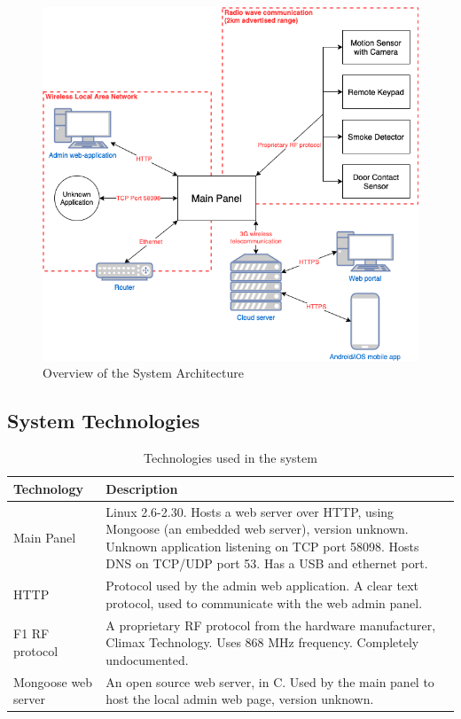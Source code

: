 \begin{figure}[!ht]
    \centering
    \includegraphics[width=\textwidth]{images/system-overview.png}
    \caption{Overview of the System Architecture}
    \label{fig:system-overview}
\end{figure}

\subsection{System Technologies}
\begin{table}[!ht]
    \centering
    \begin{tabularx}{\textwidth}{l X}
        \textbf{Technology}  & \textbf{Description} \\
        \hline
        Main Panel & Linux 2.6-2.30. Hosts a web server over HTTP, using Mongoose (an embedded web server), version unknown. Unknown application listening on TCP port 58098. Hosts DNS on TCP/UDP port 53. Has a USB and ethernet port. \\
        \hline
        HTTP  & Protocol used by the admin web application. A clear text protocol, used to communicate with the web admin panel. \\
        \hline
        F1 RF protocol  & A proprietary \gls{RF} protocol from the hardware manufacturer, Climax Technology. Uses 868 MHz frequency. Completely undocumented. \\
        \hline
        Mongoose web server  & An open source web server, in C. Used by the main panel to host the local admin web page, version unknown. \\
        \hline
    \end{tabularx}
    \caption{Technologies used in the system}
    \label{tb:system-technologies}
\end{table}

